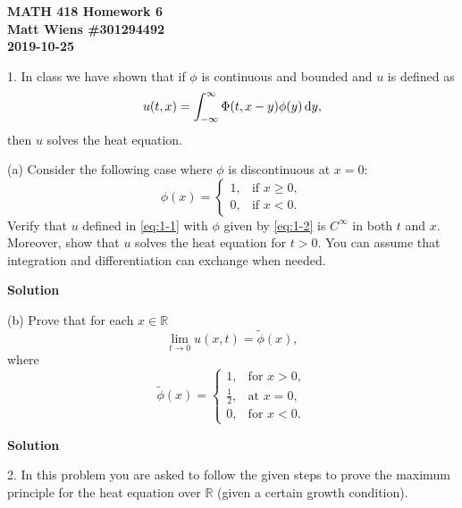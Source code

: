 \documentclass{article}
\begin{document}
\textbf{MATH 418 Homework 6} \\
\textbf{Matt Wiens \#301294492} \\
\textbf{2019-10-25}

1. In class we have shown that if $\phi$ is continuous and bounded and
$u$ is defined as
%
\begin{equation}
    u(t, x) = \int_{-\infty}^\infty \Phi(t, x - y) \phi(y) \dif y
    ,
    \label{eq:1-1}
\end{equation}
%
then $u$ solves the heat equation.

(a) Consider the following case where $\phi$ is discontinuous at
$x = 0$:
%
\begin{equation}
    \phi(x) =
        \begin{cases}
            1, & \text{if } x \geq 0, \\
            0, & \text{if } x < 0.
        \end{cases}
    \label{eq:1-2}
\end{equation}
%
Verify that $u$ defined in \eqref{eq:1-1} with $\phi$ given by
\eqref{eq:1-2} is $C^\infty$ in both $t$ and $x$. Moreover, show that
$u$ solves the heat equation for $t > 0$. You can assume that
integration and differentiation can exchange when needed.

\textbf{Solution}

\vspace{5mm}

(b) Prove that for each $x \in \mathbb{R}$
%
\begin{equation*}
    \lim_{t \to 0} u(x, t) = \widetilde{\phi}(x)
    ,
\end{equation*}
%
where
%
\begin{equation*}
    \widetilde{\phi}(x) =
        \begin{cases}
            1, & \text{for } x > 0, \\
            \frac{1}{2}, & \text{at } x = 0, \\
            0, & \text{for } x < 0.
        \end{cases}
\end{equation*}

\textbf{Solution}

\newpage

2. In this problem you are asked to follow the given steps to prove the
maximum principle for the heat equation over $\mathbb{R}$ (given a
certain growth condition).
\end{document}
